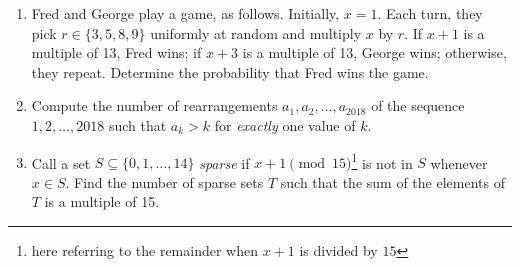 \documentclass[10pt]{article}
\begin{document}
\begin{enumerate}
\item Fred and George play a game, as follows. Initially, $x = 1$. Each turn, they pick $r \in \{3,5,8,9\}$ uniformly at random and multiply $x$ by $r$. If $x+1$ is a multiple of 13, Fred wins; if $x+3$ is a multiple of 13, George wins; otherwise, they repeat. Determine the probability that Fred wins the game.

\item Compute the number of rearrangements $a_1, a_2, \dots, a_{2018}$ of the sequence $1, 2, \dots, 2018$ such that $a_k > k$ for \textit{exactly} one value of $k$.

\item Call a set $S \subseteq \{0,1,\dots,14\}$ \textit{sparse} if $x+1 \pmod{15}$\footnote{here referring to the remainder when $x+1$ is divided by $15$} is not in $S$ whenever $x \in S$. Find the number of sparse sets $T$ such that the sum of the elements of $T$ is a multiple of 15.

\end{enumerate}
\end{document}
